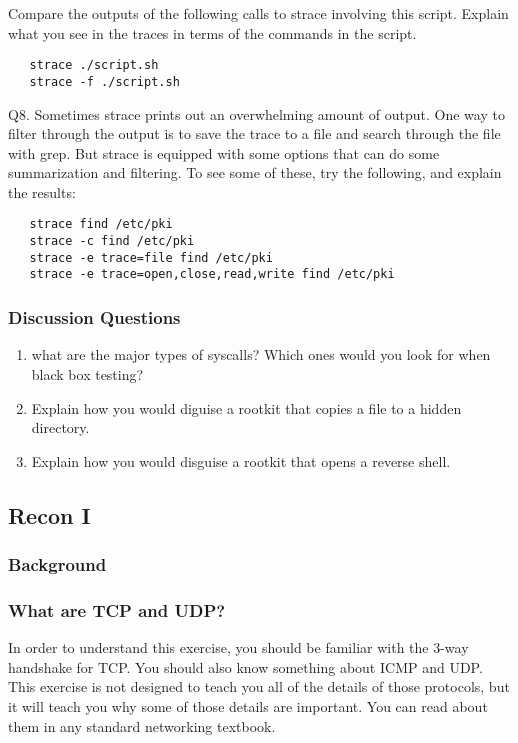 \documentclass[11pt]{report}
\begin{document}
Compare the outputs of the following calls to strace involving this script. Explain what you see in the traces in terms of the commands in the script. 

\begin{verbatim}
   strace ./script.sh
   strace -f ./script.sh
\end{verbatim}

\vspace{0.1in}
\noindent
Q8.  Sometimes strace prints out an overwhelming amount of output. One way to filter through the output is to save the trace to a file and search through the file with grep.  But strace is equipped with some options that can do some summarization and filtering. To see some of these, try the following, and explain the results:

\begin{verbatim}
   strace find /etc/pki
   strace -c find /etc/pki
   strace -e trace=file find /etc/pki
   strace -e trace=open,close,read,write find /etc/pki
\end{verbatim}

\subsubsection{Discussion Questions}
\begin{enumerate}
  \item what are the major types of syscalls?  Which ones would you look for when black box testing?
  \item Explain how you would diguise a rootkit that copies a file to a hidden directory.
  \item Explain how you would disguise a rootkit that opens a reverse shell.
\end{enumerate}



\subsection{Recon I}
\subsubsection{Background}
\subsubsection*{ What are TCP and UDP?}

In order to understand this exercise, you should be familiar with the 3-way handshake for TCP.
You should also know something about ICMP and UDP.  This exercise is not designed to teach you
all of the details of those protocols, but it will teach you why some of those details are important.
You can read about them in any standard networking textbook.
\end{document}
